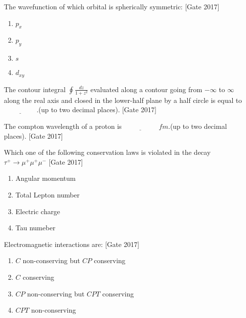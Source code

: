 \iffalse
	\author{ai24btech11019}
	\section{ph}
	\chapter{2017}
\fi
	\item The wavefunction of which orbital is spherically symmetric: \hfill{[Gate 2017]}
\begin{multicols}{4}
	\begin{enumerate}
		\item $p_x$
		\item $p_y$
		\item $s$
		\item $d_{xy}$
	\end{enumerate}
\end{multicols}
	\item The contour integral $\oint \frac{dz}{1+z^2}$ evaluated along a contour going from $- \infty$ to $\infty$ along the real axis and closed in the lower-half plane by a half circle is equal to $\underline{\hspace{2cm}}$.(up to two decimal places). \hfill{[Gate 2017]}
	\item The compton wavelength of a proton is $\underline{\hspace{2cm}}$ $fm$.(up to two decimal places).
	 \hfill{[Gate 2017]}
\item Which one of the following conservation laws is violated in the decay $\tau^{+} \rightarrow \mu^+ \mu^+ \mu^-$ \hfill{[Gate 2017]}
\begin{multicols}{2}
	\begin{enumerate}
		\item Angular momentum
		\item Total Lepton number
		\item Electric charge
		\item Tau numeber
	\end{enumerate}
\end{multicols}
	\item Electromagnetic interactions are: \hfill{[Gate 2017]}
	\begin{multicols}{2}
	\begin{enumerate}
		\item $C$ non-conserving but $CP$ conserving
		\item $C$ conserving 
		\item $CP$ non-conserving but $CPT$ conserving
		\item $CPT$ non-conserving
	\end{enumerate}
\end{multicols}
